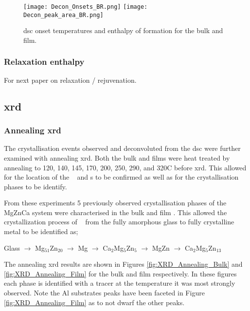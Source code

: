 \documentclass[a4paper,12pt,oneside]{article}%
\begin{document}
\begin{figure}[b]
	\centering
	\texttt{[image: Decon\_Onsets\_BR.png]}
	\medskip
	\texttt{[image: Decon\_peak\_area\_BR.png]}
	\caption{\acrshort{dsc} onset temperatures and enthalpy of formation for the bulk and film.}
	\label{fig:DSC_Decon}
\end{figure}

\subsubsection{Relaxation enthalpy}

For next paper on relaxation / rejuvenation.

\subsection{\acrshort{xrd}}
\subsubsection{Annealing \acrshort{xrd}}

The crystallisation events observed and deconvoluted from the \acrshort{dsc} were further examined with annealing \acrshort{xrd}. Both the bulk and films were heat treated by annealing to 120, 140, 145, 170, 200, 250, 290, and 320\degree C before \acrshort{xrd}. This allowed for the location of the \Tg~ and \Tx s to be confirmed as well as for the crystallisation phases to be identify.

From these experiments 5 previously observed crystallisation phases of the MgZnCa system \cite{Zhang2013, Zhang2012, Zhang2011, Khan1989, Cao2016} were characterised in the bulk and film \MgZnCa. This allowed the crystallization process of \MgZnCa~ from the fully amorphous glass to fully crystalline metal to be identified as;

\centerline{Glass $\rightarrow$ Mg$_{51}$Zn$_{20}$ $\rightarrow$ Mg $\rightarrow$ Ca$_{2}$Mg$_{5}$Zn$_{5}$ $\rightarrow$ MgZn $\rightarrow$ Ca$_{2}$Mg$_{5}$Zn$_{13}$}

The annealing \acrshort{xrd} results are shown in Figures \ref{fig:XRD_Annealing_Bulk} and \ref{fig:XRD_Annealing_Film} for the bulk and film respectively. In these figures each phase is identified with a tracer at the temperature it was most strongly observed. Note the Al substrates peaks have been faceted in Figure \ref{fig:XRD_Annealing_Film} as to not dwarf the other peaks. 
\end{document}
